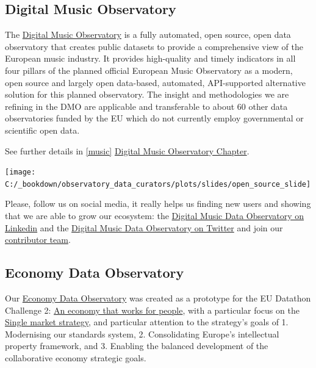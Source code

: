 \documentclass[
  a4paper,
  openany, a4paper, oneside]{book}
\begin{document}
\hypertarget{digital-music-observatory}{%
\subsection*{Digital Music Observatory}\label{digital-music-observatory}}

The \href{https://music.dataobservatory.eu/}{Digital Music Observatory} is a fully automated, open source, open data observatory that creates public datasets to provide a comprehensive view of the European music industry. It provides high-quality and timely indicators in all four pillars of the planned official European Music Observatory as a modern, open source and largely open data-based, automated, API-supported alternative solution for this planned observatory. The insight and methodologies we are refining in the DMO are applicable and transferable to about 60 other data observatories funded by the EU which do not currently employ governmental or scientific open data.

See further details in \ref{music} \protect\hyperlink{music}{Digital Music Observatory Chapter}.

\begin{center}\texttt{[image: C:/\_bookdown/observatory\_data\_curators/plots/slides/open\_source\_slide]} \end{center}

Please, follow us on social media, it really helps us finding new users and showing that we are able to grow our ecosystem: the \href{https://www.linkedin.com/company/79286750/}{Digital Music Data Observatory on Linkedin} and the \href{https://twitter.com/DigitalMusicObs}{Digital Music Data Observatory on Twitter} and join our \href{https://music.dataobservatory.eu/\#contributors}{contributor team}.

\hypertarget{economy-data-observatory}{%
\subsection*{Economy Data Observatory}\label{economy-data-observatory}}

Our \href{https://economy.dataobservatory.eu/}{Economy Data Observatory} was created as a prototype for the EU Datathon Challenge 2: \href{https://ec.europa.eu/info/strategy/priorities-2019-2024/economy-works-people_en\#:~:text=Individuals\%20and\%20businesses\%20in\%20the,needs\%20of\%20the\%20EU's\%20citizens.}{An economy that works for people}, with a particular focus on the \href{https://ec.europa.eu/info/strategy/priorities-2019-2024/economy-works-people/internal-market_en}{Single market strategy}, and particular attention to the strategy's goals of 1. Modernising our standards system, 2. Consolidating Europe's intellectual property framework, and 3. Enabling the balanced development of the collaborative economy strategic goals.
\end{document}
